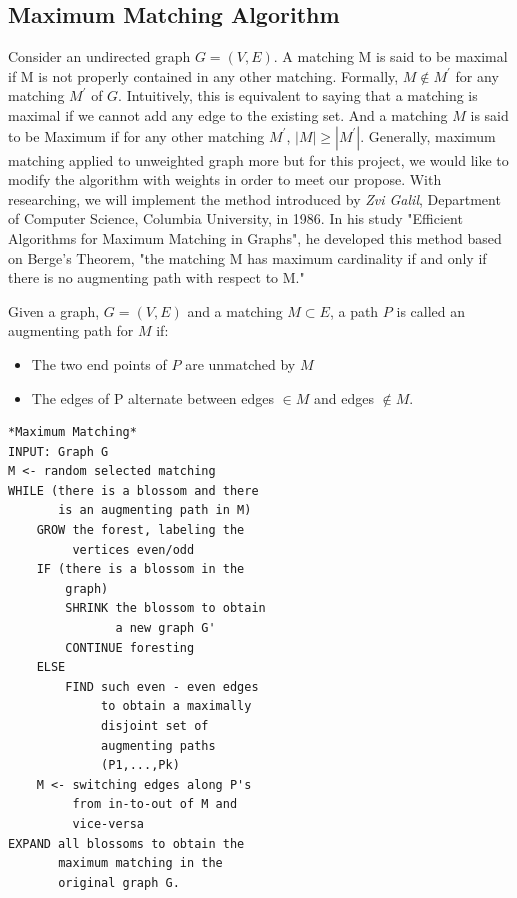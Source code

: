\documentclass[twoside,twocolumn]{article}
\begin{document}
    \subsection{Maximum Matching Algorithm}
    Consider an undirected graph $G=(V,E)$. A matching M is said to be maximal if M is not properly contained in any other matching.
    Formally, $M\notin M^{'}$ for any matching $M^{'}$ of $G$. Intuitively, this is equivalent to saying that a matching is maximal 
    if we cannot add any edge to the existing set. And a matching $M$ is said to be Maximum if for any other matching $M^{'}$, 
    $|M|\geq |M^{'}|$. Generally, maximum matching applied to unweighted graph more but for this project,
    we would like to modify the algorithm with weights in order to meet our propose. With researching, we will implement the method
    introduced by \textit{Zvi Galil}, Department of Computer Science, Columbia University, in 1986. In his study "Efficient Algorithms
    for Maximum Matching in Graphs", he developed this method based on Berge's Theorem, "the matching M has maximum cardinality if and 
    only if there is no augmenting path with respect to M."

    \indent Given a graph, $G=(V,E)$ and a matching $M \subset E$, a path $P$ is called an augmenting path for $M$ if:
    \begin{itemize}
        \item The two end points of $P$ are unmatched by $M$
        \item The edges of P alternate between edges $\in M$ and edges $\notin M$.
    \end{itemize}
    
    \begin{lstlisting}
*Maximum Matching*
INPUT: Graph G
M <- random selected matching
WHILE (there is a blossom and there 
       is an augmenting path in M)
    GROW the forest, labeling the 
         vertices even/odd
    IF (there is a blossom in the 
        graph)
        SHRINK the blossom to obtain 
               a new graph G'
        CONTINUE foresting
    ELSE
        FIND such even - even edges 
             to obtain a maximally 
             disjoint set of 
             augmenting paths 
             (P1,...,Pk)
    M <- switching edges along P's 
         from in-to-out of M and 
         vice-versa
EXPAND all blossoms to obtain the 
       maximum matching in the 
       original graph G.

    \end{lstlisting}
    
\end{document}
